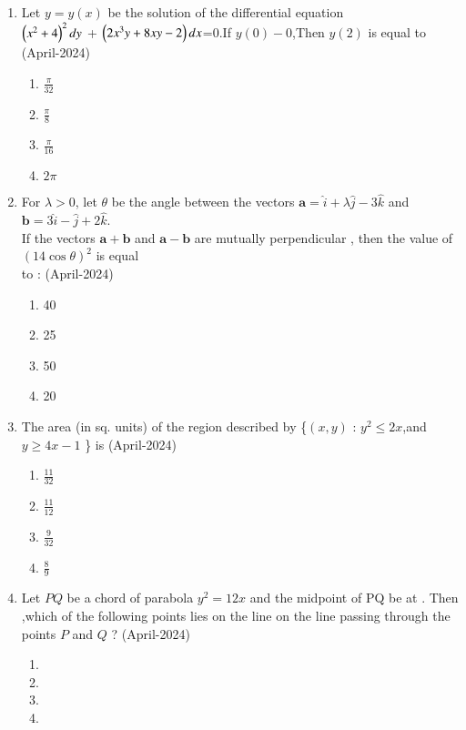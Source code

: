 \documentclass[journal,12pt,onecolumn]{IEEEtran}
\theoremstyle{remark}
\begin{document}
\begin{enumerate}
\item Let $y=y(x)$ be the solution of the differential equation \\
$\left(x^2+4\right)^2dy$ + $\left(2x^3y+8xy-2\right)dx$=0.If $y(0)-0$,Then $y(2)$ is equal to 
\hfill{(April-2024)}
\begin{multicols}{2}
\begin{enumerate}
\item $\frac{\pi}{32}$
\item $\frac{\pi}{8}$
\item $\frac{\pi}{16}$
\item $2\pi$
\end{enumerate}
\end{multicols}
\item For $\lambda > 0$, let $\theta$ be the angle between the vectors $\mathbf{a} = \hat{i} + \lambda \hat{j} - 3 \hat{k}$ and $\mathbf{b} = 3 \hat{i} - \hat{j} + 2 \hat{k}$. \\
If the vectors $\mathbf{a} + \mathbf{b}$ and $\mathbf{a} - \mathbf{b}$ are mutually perpendicular , then the value of $(14\cos{\theta})^2$ is equal \\to :     
\hfill{(April-2024)}
\begin{multicols}{2}
\begin{enumerate}
\item 40
\item 25
\item 50
\item 20
\end{enumerate}
\end{multicols}
\item The area (in sq. units) of the region described by \{$(x, y)$ : $y^2 \leq 2x$,and $y \geq 4x - 1$ \} is
\hfill{(April-2024)}
\begin{multicols}{2}
\begin{enumerate}
\item $\frac{11}{32}$
\item $\frac{11}{12}$
\item $\frac{9}{32}$
\item $\frac{8}{9}$
\end{enumerate}
\end{multicols}
\item Let $PQ$ be a chord of parabola $y^2=12x$ and the midpoint of PQ be at  . Then ,which of the following points lies on the line on the line passing through the points $P$ and $Q$ ?
\hfill{(April-2024)}
\begin{multicols}{2}
\begin{enumerate}
\item {}
\item {}
\item {}
\item {}
\end{enumerate}
\end{multicols}
\end{enumerate}
\end{document}
